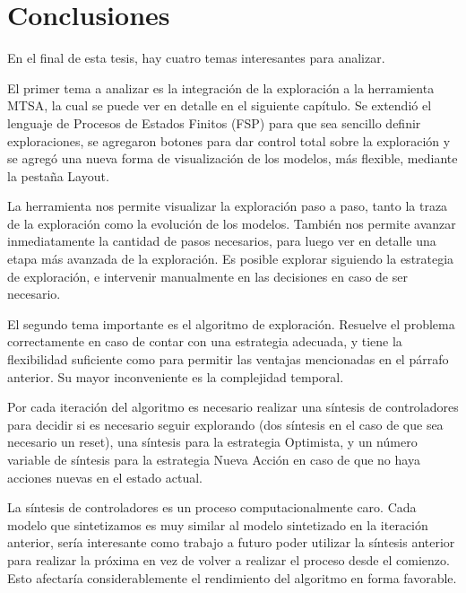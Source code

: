 \chapter{Conclusiones}

En el final de esta tesis, hay cuatro temas interesantes para analizar.

\vspace{\baselineskip}
El primer tema a analizar es la integración de la exploración a la herramienta MTSA, la cual se puede ver en detalle en el 
siguiente capítulo. 
Se extendió el lenguaje de Procesos de Estados Finitos (FSP) para que sea sencillo definir exploraciones, se agregaron botones 
para dar control total sobre la exploración y se agregó una nueva forma de visualización de los modelos, más flexible, mediante 
la pestaña Layout.

\vspace{\baselineskip}
La herramienta nos permite visualizar la exploración paso a paso, tanto la traza de la exploración como la 
evolución de los modelos. También nos permite avanzar inmediatamente la cantidad de pasos necesarios, para luego ver en detalle 
una etapa más avanzada de la exploración. Es posible explorar siguiendo la estrategia de exploración, e intervenir manualmente 
en las decisiones en caso de ser necesario.

\vspace{\baselineskip}
El segundo tema importante es el algoritmo de exploración. Resuelve el problema correctamente en caso de contar con una estrategia 
adecuada, y tiene la flexibilidad suficiente como para permitir las ventajas mencionadas en el párrafo anterior. Su mayor 
inconveniente es la complejidad temporal.

\vspace{\baselineskip}
Por cada iteración del algoritmo es necesario realizar una síntesis de controladores para decidir si es necesario seguir explorando 
(dos síntesis en el caso de que sea necesario un reset), una síntesis para la estrategia Optimista, y un número variable de síntesis 
para la estrategia Nueva Acción en caso de que no haya acciones nuevas en el estado actual.

\vspace{\baselineskip}
La síntesis de controladores es un proceso computacionalmente caro. Cada modelo que sintetizamos es muy similar al modelo sintetizado 
en la iteración anterior, sería interesante como trabajo a futuro poder utilizar la síntesis anterior para realizar la próxima en 
vez de volver a realizar el proceso desde el comienzo. Esto afectaría considerablemente el rendimiento del algoritmo en forma favorable.

